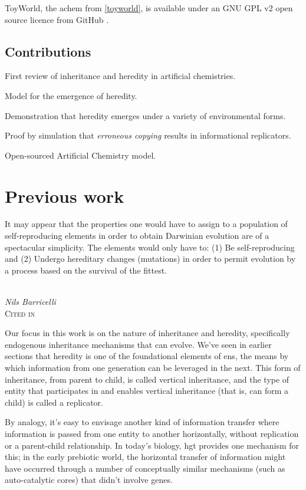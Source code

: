 ToyWorld, the \gls{achem} from \ref{toyworld}, is available under an GNU GPL v2 open source licence from GitHub \cite{toyworld}.

\section{Contributions}\label{contributions}

\begin{compactenum}
\item First review of inheritance and heredity in artificial chemistries.
\item Model for the emergence of heredity.
\item Demonstration that heredity emerges under a variety of environmental forms.
\item Proof by simulation that \emph{erroneous copying} \parencite{Zachar2010} results in informational replicators.
\item Open-sourced Artificial Chemistry model.
\end{compactenum}

\chapter{Previous work}\label{previous-work}

\epigraph{%
It may appear that the properties one would have to assign to a population of self-reproducing elements in order to obtain Darwinian evolution are of a spectacular simplicity. The elements would only have to: (1) Be self-reproducing and (2) Undergo hereditary changes (mutations) in order to permit evolution by a process based on the survival of the fittest.}%
{\textit{\\Nils Barricelli}\\\textsc{Cited in \cite{Taylor2001}}}

Our focus in this work is on the nature of inheritance and heredity, specifically endogenous inheritance mechanisms that can evolve. We’ve seen in earlier sections that heredity is one of the foundational elements of \gls{ens}, the means by which information from one generation can be leveraged in the next. This form of inheritance, from parent to child, is called vertical inheritance, and the type of entity that participates in and enables vertical inheritance (that is, can form a child) is called a replicator. 

By analogy, it’s easy to envisage another kind of information transfer where information is passed from one entity to another horizontally, without replication or a parent-child relationship. In today’s biology, \gls{hgt} provides one mechanism for this; in the early prebiotic world, the horizontal transfer of information might have occurred through a number of conceptually similar mechanisms (such as auto-catalytic cores) that didn’t involve genes. 

